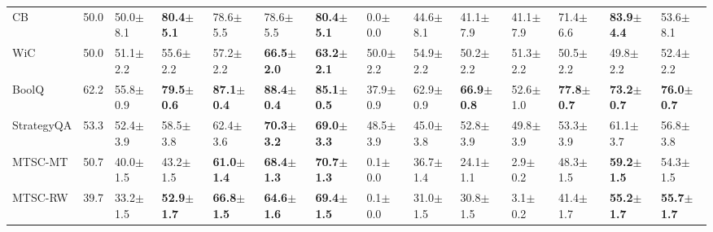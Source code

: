 \documentclass[letterpaper]{article} %
\begin{document}
\begin{table}[h!]
{\begin{tabular}{l||llllll||lllllll}
         CB &     50.0 &           50.0$\pm$8.1 &  \textbf{80.4$\pm$5.1} &           78.6$\pm$5.5 &           78.6$\pm$5.5 &  \textbf{80.4$\pm$5.1} &            0.0$\pm$0.0 &           44.6$\pm$8.1 &           41.1$\pm$7.9 &           41.1$\pm$7.9 &           71.4$\pm$6.6 &  \textbf{83.9$\pm$4.4} &           53.6$\pm$8.1 \\
        WiC &     50.0 &           51.1$\pm$2.2 &           55.6$\pm$2.2 &           57.2$\pm$2.2 &  \textbf{66.5$\pm$2.0} &  \textbf{63.2$\pm$2.1} &           50.0$\pm$2.2 &           54.9$\pm$2.2 &           50.2$\pm$2.2 &           51.3$\pm$2.2 &           50.5$\pm$2.2 &           49.8$\pm$2.2 &           52.4$\pm$2.2 \\
      BoolQ &     62.2 &           55.8$\pm$0.9 &  \textbf{79.5$\pm$0.6} &  \textbf{87.1$\pm$0.4} &  \textbf{88.4$\pm$0.4} &  \textbf{85.1$\pm$0.5} &           37.9$\pm$0.9 &           62.9$\pm$0.9 &  \textbf{66.9$\pm$0.8} &           52.6$\pm$1.0 &  \textbf{77.8$\pm$0.7} &  \textbf{73.2$\pm$0.7} &  \textbf{76.0$\pm$0.7} \\\cline{1-1} \cline{2-4} \cline{8-9}
 StrategyQA &     53.3 &           52.4$\pm$3.9 &           58.5$\pm$3.8 &           \multicolumn{1}{|l}{62.4$\pm$3.6} &  \textbf{70.3$\pm$3.2} &  \textbf{69.0$\pm$3.3} &           48.5$\pm$3.9 &           45.0$\pm$3.8 &           \multicolumn{1}{|l}{52.8$\pm$3.9} &           49.8$\pm$3.9 &           53.3$\pm$3.9 &           61.1$\pm$3.7 &           56.8$\pm$3.8 \\
    MTSC-MT &     50.7 &           40.0$\pm$1.5 &           43.2$\pm$1.5 &  \multicolumn{1}{|l}{\textbf{61.0$\pm$1.4}} &  \textbf{68.4$\pm$1.3} &  \textbf{70.7$\pm$1.3} &            0.1$\pm$0.0 &           36.7$\pm$1.4 &           \multicolumn{1}{|l}{24.1$\pm$1.1} &            2.9$\pm$0.2 &           48.3$\pm$1.5 &  \textbf{59.2$\pm$1.5} &           54.3$\pm$1.5 \\
    MTSC-RW &     39.7 &           33.2$\pm$1.5 &  \textbf{52.9$\pm$1.7} &  \multicolumn{1}{|l}{\textbf{66.8$\pm$1.5}} &  \textbf{64.6$\pm$1.6} &  \textbf{69.4$\pm$1.5} &            0.1$\pm$0.0 &           31.0$\pm$1.5 &           \multicolumn{1}{|l}{30.8$\pm$1.5} &            3.1$\pm$0.2 &           41.4$\pm$1.7 &  \textbf{55.2$\pm$1.7} &  \textbf{55.7$\pm$1.7} \\\cline{5-7} \cline{10-10}

\end{tabular}}
\end{table}
\end{document}
